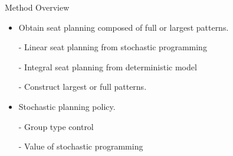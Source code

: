 \begin{frame}{Method Overview}
  \begin{itemize}
    \item Obtain seat planning composed of full or largest patterns.
    
    - Linear seat planning from stochastic programming
    
    - Integral seat planning from deterministic model

    - Construct largest or full patterns.

    \item Stochastic planning policy.

    - Group type control

    - Value of stochastic programming

  \end{itemize}
\end{frame}
